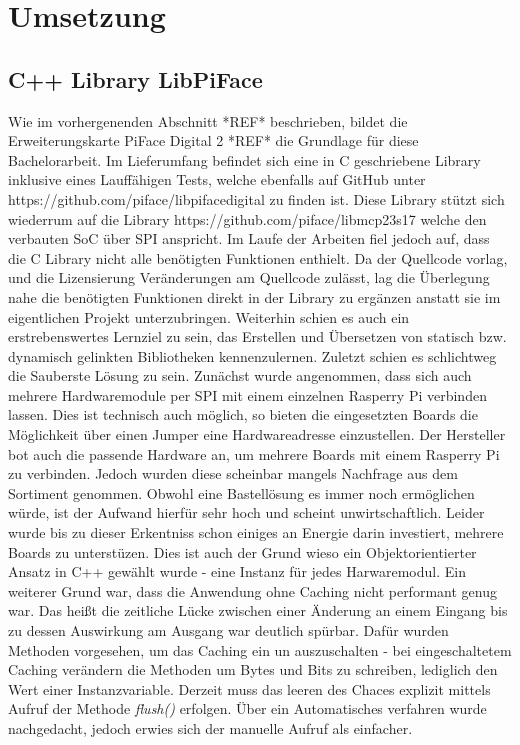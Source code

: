 \section{Umsetzung}\label{kap:ums}
   
\subsection{C++ Library LibPiFace}
Wie im vorhergenenden Abschnitt *REF* beschrieben, bildet die Erweiterungskarte PiFace Digital 2 *REF* die Grundlage für diese Bachelorarbeit. Im Lieferumfang befindet sich eine in C geschriebene Library inklusive eines Lauffähigen Tests, welche ebenfalls auf GitHub unter https://github.com/piface/libpifacedigital zu finden ist. Diese Library stützt sich wiederrum auf die Library https://github.com/piface/libmcp23s17 welche den verbauten SoC über SPI anspricht. Im Laufe der Arbeiten fiel jedoch auf, dass die C Library nicht alle benötigten Funktionen enthielt. Da der Quellcode vorlag, und die Lizensierung Veränderungen am Quellcode zulässt, lag die Überlegung nahe die benötigten Funktionen direkt in der Library zu ergänzen anstatt sie im eigentlichen Projekt unterzubringen. Weiterhin schien es auch ein erstrebenswertes Lernziel zu sein, das Erstellen und Übersetzen von statisch bzw. dynamisch gelinkten Bibliotheken kennenzulernen. Zuletzt schien es schlichtweg die Sauberste Lösung zu sein. Zunächst wurde angenommen, dass sich auch mehrere Hardwaremodule per SPI mit einem einzelnen Rasperry Pi verbinden lassen. Dies ist technisch auch möglich, so bieten die eingesetzten Boards die Möglichkeit über einen Jumper eine Hardwareadresse einzustellen. Der Hersteller bot auch die passende Hardware an, um mehrere Boards mit einem Rasperry Pi zu verbinden. Jedoch wurden diese scheinbar mangels Nachfrage aus dem Sortiment genommen. Obwohl eine Bastellösung es immer noch ermöglichen würde, ist der Aufwand hierfür sehr hoch und scheint unwirtschaftlich. Leider wurde bis zu dieser Erkentniss schon einiges an Energie darin investiert, mehrere Boards zu unterstüzen. Dies ist auch der Grund wieso ein Objektorientierter Ansatz in C++ gewählt wurde - eine Instanz für jedes Harwaremodul. Ein weiterer Grund war, dass die Anwendung ohne Caching nicht performant genug war. Das heißt die zeitliche Lücke zwischen einer Änderung an einem Eingang bis zu dessen Auswirkung am Ausgang war deutlich spürbar. Dafür wurden Methoden vorgesehen, um das Caching ein un auszuschalten - bei eingeschaltetem Caching verändern die Methoden um Bytes und Bits zu schreiben, lediglich den Wert einer Instanzvariable. Derzeit muss das leeren des Chaces explizit mittels Aufruf der Methode \textit{flush()} erfolgen. Über ein Automatisches verfahren wurde nachgedacht, jedoch erwies sich der manuelle Aufruf als einfacher. 

